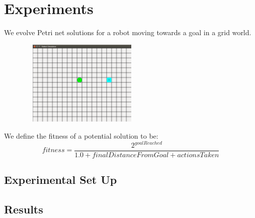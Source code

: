 \documentclass[12pt,a4paper,twocolumn]{article}
\begin{document}
\section{Experiments}

We evolve Petri net solutions for a robot moving towards a goal in a grid world.
\begin{figure}
\includegraphics[trim = 80mm 80mm 20mm 70mm, clip, width = 2.4in, height = 1.6in]{robot_sim.png}
\end{figure}
We define the fitness of a potential solution to be:
$$fitness = \frac{2^{goalReached}}{1.0 + finalDistanceFromGoal + actionsTaken}$$

\subsection{Experimental Set Up}

\subsection{Results}
\end{document}
